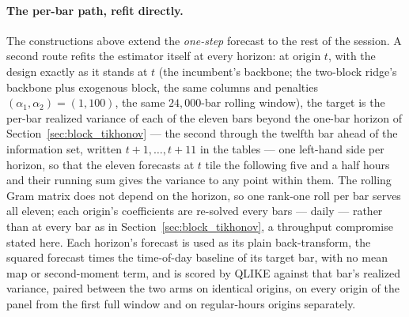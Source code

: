 \ifdefined\dmhN\else\fi

\paragraph{The per-bar path, refit directly.} The constructions above
extend the \emph{one-step} forecast to the rest of the session. A
second route refits the estimator itself at every horizon: at origin
$t$, with the design exactly as it stands at $t$ (the incumbent's
backbone; the two-block ridge's backbone plus exogenous block, the same
columns and penalties $(\alpha_1,\alpha_2) = (1, 100)$, the same
$24{,}000$-bar rolling window), the target is the per-bar realized
variance of each of the eleven bars beyond the one-bar horizon of
Section~\ref{sec:block_tikhonov} --- the second through the twelfth
bar ahead of the information set, written $t+1, \dots, t+11$ in the
tables --- one left-hand side per horizon, so that the eleven
forecasts at $t$ tile the following five and a half hours and their
running sum gives the variance to any point within them. The rolling Gram matrix does not
depend on the horizon, so one rank-one roll per bar serves all eleven;
each origin's coefficients are re-solved every \dmhRefit{} bars ---
daily --- rather than at every bar as in Section~\ref{sec:block_tikhonov},
a throughput compromise stated here. Each horizon's forecast is used as
its plain back-transform, the squared forecast times the time-of-day
baseline of its target bar, with no mean map or second-moment term, and
is scored by QLIKE against that bar's realized variance, paired between
the two arms on identical origins, on every origin of the panel from
the first full window and on regular-hours origins separately.
